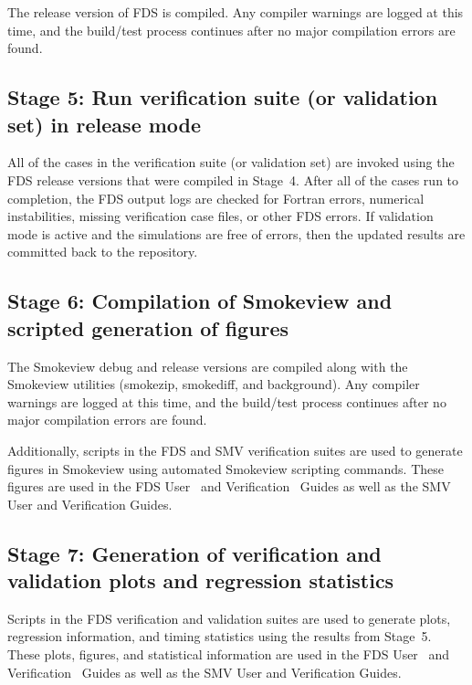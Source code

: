 \documentclass[11pt]{book}
\begin{document}
The release version of FDS is compiled. Any compiler warnings are logged at this time, and the build/test process continues after no major compilation errors are found.

\subsection*{Stage 5: Run verification suite (or validation set) in release mode}

All of the cases in the verification suite (or validation set) are invoked using the FDS release versions that were compiled in Stage~4. After all of the cases run to completion, the FDS output logs are checked for Fortran errors, numerical instabilities, missing verification case files, or other FDS errors. If validation mode is active and the simulations are free of errors, then the updated results are committed back to the repository.

\subsection*{Stage 6: Compilation of Smokeview and scripted generation of figures}

The Smokeview debug and release versions are compiled along with the Smokeview utilities (smokezip, smokediff, and background). Any compiler warnings are logged at this time, and the build/test process continues after no major compilation errors are found.

Additionally, scripts in the FDS and SMV verification suites are used to generate figures in Smokeview using automated Smokeview scripting commands. These figures are used in the FDS User~\cite{FDS_Users_Guide} and Verification~\cite{FDS_Verification_Guide} Guides as well as the SMV User and Verification Guides.

\subsection*{Stage 7: Generation of verification and validation plots and regression statistics}

Scripts in the FDS verification and validation suites are used to generate plots, regression information, and timing statistics using the results from Stage~5. These plots, figures, and statistical information are used in the FDS User~\cite{FDS_Users_Guide} and Verification~\cite{FDS_Verification_Guide} Guides as well as the SMV User and Verification Guides.
\end{document}
